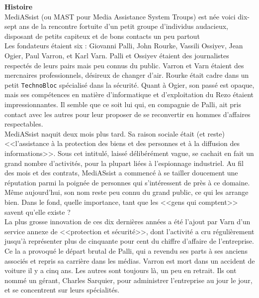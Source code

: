 \documentclass[11pt,twoside,a4paper]{article}
\begin{document}
\begin{multicols}{2}
\textbf{\Large Histoire}~\\
MediASsist (ou MAST pour Media Assistance System Troups) est n{\'e}e voici dix-sept ans de la rencontre fortuite d'un petit groupe d'individus audacieux, disposant de petits capiteux et de bons contacts un peu partout ~\\
Les fondateurs {\'e}taient six : Giovanni Palli, John Rourke, Vassili Ossiyev, Jean Ogier, Paul Varron, et Karl Varn. Palli et Ossiyev {\'e}taient des journalistes respect{\'e}s de leurs pairs mais peu connus du public. Varron et Varn {\'e}taient des mercnaires professionnels, d{\'e}sireux de changer d'air. Rourke {\'e}tait cadre dans un petit \texttt{TechnoBloc} sp{\'e}cialis{\'e} dans la s{\'e}curit{\'e}. Quant {\`a} Ogier, son pass{\'e} est opaque, mais ses comp{\'e}tences en mati{\`e}re d'informatique et d'exploitation du Rezo {\'e}taient impressionnantes. Il semble que ce soit lui qui, en compagnie de Palli, ait pris contact avec les autres pour leur proposer de se reconvertir en hommes d'affaires respectables. ~\\
MediASsist naquit deux mois plus tard. Sa raison sociale {\'e}tait (et reste) <<l'assistance {\`a} la protection des biens et des personnes et {\`a} la diffusion des informations>>. Sous cet intitul{\'e}, laiss{\'e} d{\'e}lib{\'e}r{\'e}ment vague, se cachait en fait un grand nombre d'activit{\'e}s, pour la plupart li{\'e}es {\`a} l'espionnage industriel. Au fil des mois et des contrats, MediASsist a commenc{\'e} {\`a} se tailler doucement une r{\'e}putation parmi la poign{\'e}e de personnes qui s'int{\'e}ressent de pr{\`e}s {\`a} ce domaine. M{\^e}me aujourd'hui, son nom reste peu connu du grand public, ce qui les arrange bien. Dans le fond, quelle importance, tant que les <<gens qui comptent>> savent qu'elle existe ? ~\\
La plus grosse innovation de ces dix derni{\`e}res ann{\'e}es a {\'e}t{\'e} l'ajout par Varn d'un service annexe de <<protection et s{\'e}curit{\'e}>>, dont l'activit{\'e} a cru r{\'e}guli{\`e}rement jusqu'{\`a} repr{\'e}senter plus de cinquante pour cent du chiffre d'affaire de l'entreprise. Ce la a provoqu{\'e} le d{\'e}part brutal de Palli, qui a revendu ses parts {\`a} ses anciens associ{\'e}s et repris sa carri{\`e}re dans les m{\'e}dias. Varron est mort dans un accident de voiture il y a cinq ans. Les autres sont toujours l{\`a}, un peu en retrait. Ils ont nomm{\'e} un g{\'e}rant, Charles Sarquier, pour administrer l'entreprise au jour le jour, et se concentrent sur leurs sp{\'e}cialit{\'e}s. ~\\ 


\end{multicols}
\end{document}
